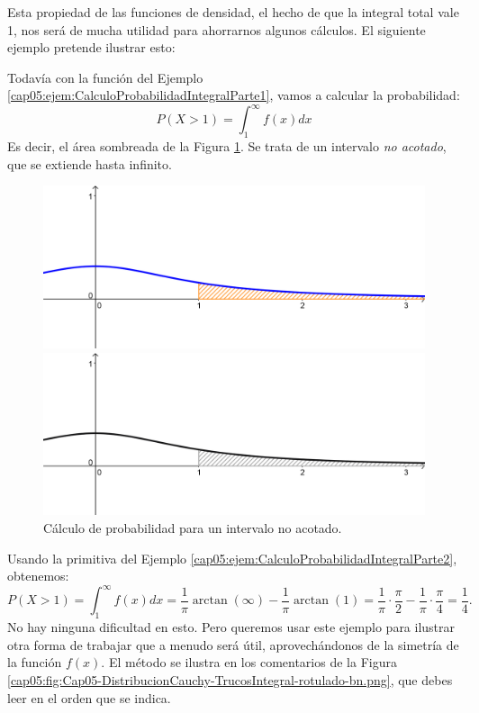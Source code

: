 Esta propiedad de las funciones de densidad, el hecho de que la integral total vale 1, nos será de mucha utilidad para ahorrarnos algunos cálculos. El siguiente ejemplo pretende ilustrar esto:
\begin{ejemplo}\label{cap05:ejem:DistribucionCauchyTrucosProbabilidad}
    Todavía con la función del Ejemplo \ref{cap05:ejem:CalculoProbabilidadIntegralParte1}, vamos a calcular la probabilidad:
    \[
    P(X>1)=\int_1^{\infty}f(x)dx
    \]
    Es decir, el área sombreada de la Figura \ref{cap05:fig:Cap05-DistribucionCauchy-IntegralColaDerecha}. Se trata de un intervalo {\em no acotado}, que se extiende hasta infinito.

\begin{figure}[htbp]
\begin{center}
\begin{enColor}
\includegraphics[width=12cm]{../fig/Cap05-DistribucionCauchy-IntegralColaDerecha.png}
\end{enColor}
\begin{bn}
\includegraphics[width=12cm]{../fig/Cap05-DistribucionCauchy-IntegralColaDerecha-bn.png}
\end{bn}
\caption{Cálculo de probabilidad para un intervalo no acotado.}
\label{cap05:fig:Cap05-DistribucionCauchy-IntegralColaDerecha}
\end{center}
\end{figure}

    Usando la primitiva del Ejemplo \ref{cap05:ejem:CalculoProbabilidadIntegralParte2}, obtenemos:
    \[
    P(X>1)=\int_1^{\infty}f(x)dx=\dfrac{1}{\pi}\arctan(\infty)-\dfrac{1}{\pi}\arctan(1)=
    \dfrac{1}{\pi}\cdot\dfrac{\pi}{2}-\dfrac{1}{\pi}\cdot\dfrac{\pi}{4}=\dfrac{1}{4}.
    \]
    No hay ninguna dificultad en esto. Pero queremos usar este ejemplo para ilustrar otra forma de trabajar que a menudo será útil, aprovechándonos de la simetría de la función $f(x)$. El método se ilustra en los comentarios de la Figura \ref{cap05:fig:Cap05-DistribucionCauchy-TrucosIntegral-rotulado-bn.png}, que debes leer en el orden que se indica.


\end{ejemplo}
